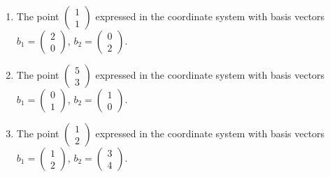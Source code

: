 \documentclass[11pt]{article}
\begin{document}
\begin{enumerate}
	\item The point $\begin{pmatrix}1 \\1\end{pmatrix}$ expressed in the coordinate system with basis vectors $b_1 = \begin{pmatrix}2 \\0\end{pmatrix}$, $b_2 = \begin{pmatrix}0 \\2\end{pmatrix}$. 
	\item The point $\begin{pmatrix}5 \\3 \end{pmatrix}$ expressed in the coordinate system with basis vectors $b_1 = \begin{pmatrix}0 \\1\end{pmatrix}$, $b_2 = \begin{pmatrix}1 \\0\end{pmatrix}$. 
	\item The point $\begin{pmatrix}1 \\2 \end{pmatrix}$ expressed in the coordinate system with basis vectors $b_1 = \begin{pmatrix}1 \\2\end{pmatrix}$, $b_2 = \begin{pmatrix}3 \\4\end{pmatrix}$. 
\end{enumerate}
\end{document}
